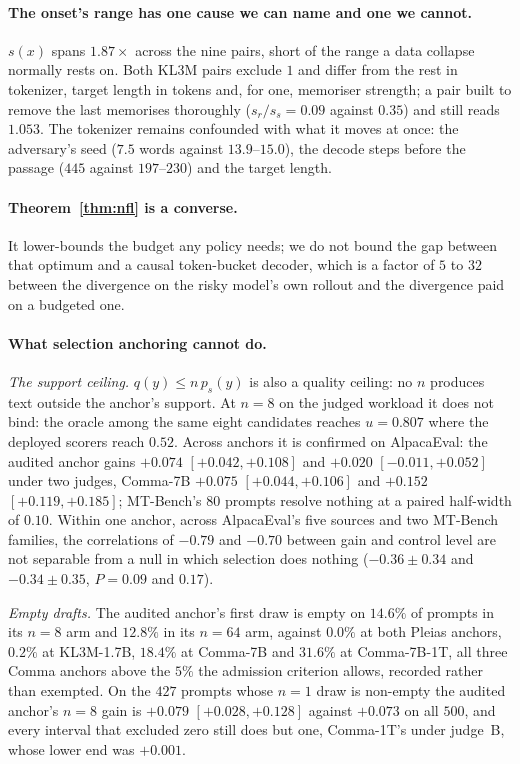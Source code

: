 \paragraph{The onset's range has one cause we can name and one we cannot.}
$s(x)$ spans $1.87\times$ across the nine pairs, short of the range a data collapse normally rests on. Both
KL3M pairs exclude $1$ and differ from the rest in tokenizer, target length in tokens and, for one, memoriser
strength; a pair built to remove the last memorises thoroughly ($s_r/s_s = 0.09$ against $0.35$) and still
reads $1.053$. The tokenizer remains confounded with what it moves at once: the adversary's seed ($7.5$
words against $13.9$--$15.0$), the decode steps before the passage ($445$ against $197$--$230$) and the
target length.

\paragraph{Theorem~\ref{thm:nfl} is a converse.}
It lower-bounds the budget any policy needs; we do not bound the gap between that optimum and a causal
token-bucket decoder, which is a factor of $5$ to $32$ between the divergence on the risky model's own
rollout and the divergence paid on a budgeted one.

\paragraph{What selection anchoring cannot do.}
\emph{The support ceiling.} $q(y) \le n\,p_s(y)$ is also a quality ceiling: no $n$ produces text outside the
anchor's support. At $n=8$ on the judged workload it does not bind: the oracle among the same eight
candidates reaches $u = 0.807$ where the deployed scorers reach $0.52$. Across anchors it is confirmed on
AlpacaEval: the audited anchor gains $+0.074$ $[+0.042, +0.108]$ and $+0.020$ $[-0.011, +0.052]$ under two
judges, Comma-7B $+0.075$ $[+0.044, +0.106]$ and $+0.152$ $[+0.119, +0.185]$; MT-Bench's $80$ prompts
resolve nothing at a paired half-width of $0.10$. Within one anchor, across AlpacaEval's five sources and
two MT-Bench families, the correlations of $-0.79$ and $-0.70$ between gain and control level are not
separable from a null in which selection does nothing ($-0.36 \pm 0.34$ and $-0.34 \pm 0.35$, $P = 0.09$
and $0.17$).

\emph{Empty drafts.} The audited anchor's first draw is empty on $14.6\%$ of prompts in its $n=8$ arm and
$12.8\%$ in its $n=64$ arm, against $0.0\%$ at both Pleias anchors, $0.2\%$ at KL3M-1.7B, $18.4\%$ at
Comma-7B and $31.6\%$ at Comma-7B-1T, all three Comma anchors above the $5\%$ the admission criterion
allows, recorded rather than exempted. On the $427$ prompts whose $n=1$ draw is non-empty the audited
anchor's $n=8$ gain is $+0.079$ $[+0.028, +0.128]$ against $+0.073$ on all $500$, and every interval that
excluded zero still does but one, Comma-1T's under judge~B, whose lower end was $+0.001$.

